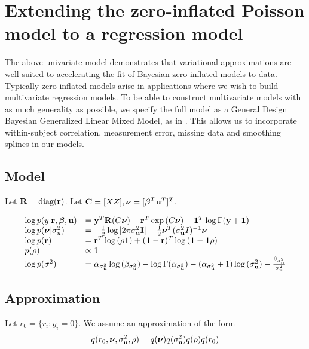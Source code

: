 \documentclass{amsart}[12pt]
\begin{document}
\section{Extending the zero-inflated Poisson model to a regression model}
The above univariate model demonstrates that variational approximations are well-suited
to accelerating the fit of Bayesian zero-inflated models to data. Typically zero-inflated
models arise in applications where we wish to build multivariate regression models. To be able to
construct multivariate models with as much generality as possible, we specify the full
model as a General Design Bayesian Generalized Linear Mixed Model, as in \cite{zhao06}.
This allows us to incorporate within-subject correlation, measurement error, missing data
and smoothing splines in our models.



\subsection{Model}
Let ${\bf R} = \text{diag}{({\bf r})}$. Let ${\bf C} = [X Z], {\boldsymbol \nu} = [{\boldsymbol \beta}^T {\bf u}^T]^T$.

$$
\begin{array}{ll}
\log{p(y|{\bf r}, {\boldsymbol\beta}, {\bf u})} &= {\bf y}^T {\bf R} (C{\boldsymbol \nu}) - {\bf r}^T \exp{(C{\boldsymbol\nu})} - {\bf 1}^T \log{\Gamma{({\bf y}+ {\bf1})}} \\
\log{p({\boldsymbol\nu}|\sigma_{u}^2)} &= - {\frac{1}{2}} \log{|2\pi \sigma_{{\bf u}}^2 {\bf I}|} - {\frac{1}{2}} {\boldsymbol \nu}^T(\sigma_{{\bf u}}^2 I)^{-1} {\boldsymbol \nu} \\
\log{p({\bf r})} &= {\bf r}^T \log{(\rho {\bf1})} + ({\bf 1} - {\bf r})^T\log{({\bf1}- {\bf1}\rho)} \\
p(\rho) &\propto 1 \\
\log{p(\sigma^2)} &= \alpha_{\sigma_{\bf u}^2} \log{(\beta_{\sigma_{\bf u}^2})} - \log{\Gamma{(\alpha_{\sigma_{\bf u}^2})}} - (\alpha_{\sigma_{\bf u}^2} + 1) \log{(\sigma_{{\bf u}}^2)} - \frac{\beta_{\sigma_{\bf u}^2}}{\sigma_{{\bf u}}^2}\\
\end{array}
$$

\subsection{Approximation}
Let $r_0 = \{ r_i : y_i = 0 \}$.
We assume an approximation of the form
$$
q(r_0, {\boldsymbol \nu}, \sigma_{{\bf u}}^2, \rho) = q({\boldsymbol \nu}) q(\sigma_{{\bf u}}^2) q(\rho) q(r_0) \\
$$
\end{document}
